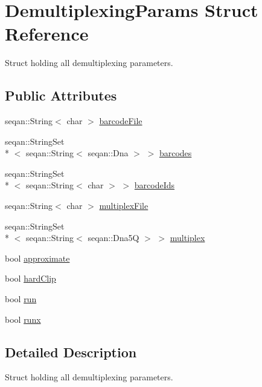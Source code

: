 \hypertarget{struct_demultiplexing_params}{\section{Demultiplexing\-Params Struct Reference}
\label{struct_demultiplexing_params}
}


Struct holding all demultiplexing parameters.  


\subsection*{Public Attributes}
\begin{DoxyCompactItemize}
\item 
seqan\-::\-String$<$ char $>$ \hyperlink{struct_demultiplexing_params_a2b2b682fbf21f3ca8daafe3e9b83c0ca}{barcode\-File}
\item 
seqan\-::\-String\-Set\\*
$<$ seqan\-::\-String$<$ seqan\-::\-Dna $>$ $>$ \hyperlink{struct_demultiplexing_params_aaeea114c00f19f6565047e507a74f90f}{barcodes}
\item 
seqan\-::\-String\-Set\\*
$<$ seqan\-::\-String$<$ char $>$ $>$ \hyperlink{struct_demultiplexing_params_a1721fa9ad83112b0d2df9c2932bd00be}{barcode\-Ids}
\item 
seqan\-::\-String$<$ char $>$ \hyperlink{struct_demultiplexing_params_a93d9e02c35225dac383b7c52f7b539f7}{multiplex\-File}
\item 
seqan\-::\-String\-Set\\*
$<$ seqan\-::\-String$<$ seqan\-::\-Dna5\-Q $>$ $>$ \hyperlink{struct_demultiplexing_params_a6d5a685bccab390519e4b423018443f7}{multiplex}
\item 
bool \hyperlink{struct_demultiplexing_params_ae76872bea7b75ea020035f7825fc8210}{approximate}
\item 
bool \hyperlink{struct_demultiplexing_params_a28920791fd2dfa590dade23f2924b93a}{hard\-Clip}
\item 
bool \hyperlink{struct_demultiplexing_params_a4a52e0b0dbbacf3e1d4e2b115f3d8cf7}{run}
\item 
bool \hyperlink{struct_demultiplexing_params_aa7bf93a371b34c9ad7ae0a5dc8edc8c5}{runx}
\end{DoxyCompactItemize}


\subsection{Detailed Description}
Struct holding all demultiplexing parameters. 

